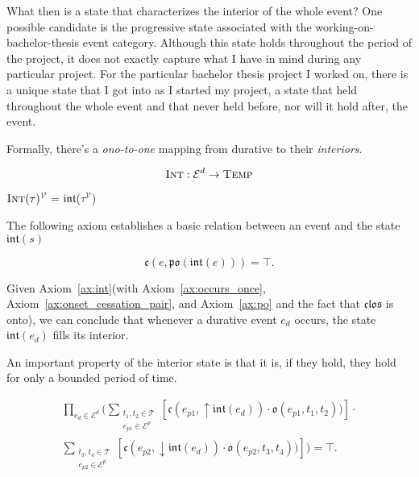 What then is a state that characterizes the interior of the whole event? One possible candidate is the progressive state associated with the working-on-bachelor-thesis event category.
Although this state holds throughout the period of the project, it does not exactly capture what I have in mind during any particular project.
For the particular bachelor thesis project I worked on, there is a unique state that I got into as I started my project, a state that held throughout the whole event and that never held before, nor will it hold after, the event.

Formally, there's a \textit{ono-to-one} mapping from durative to their \textit{interiors}.
\begin{defn}
    \begin{equation}
        \textsc{Int} : \mathcal{E}^{d} \to \textsc{Temp}
    \end{equation}
\end{defn}

\begin{defn}
    \textlbrackdbl $\textsc{Int}(\tau)$\textrbrackdbl$^{\mathcal{V}}$
    = $\mathfrak{int}$(\textlbrackdbl $\tau$\textrbrackdbl$^{\mathcal{V}}$)
\end{defn}

The following axiom establishes a basic relation between an event and the state $\mathfrak{int}(s)$
\begin{axiom}\label{ax:int}
    \begin{equation}
        \mathfrak{c}(e, \mathfrak{po}(\mathfrak{int}(e))) = \top.
    \end{equation}
\end{axiom}

Given Axiom~\ref{ax:int}(with Axiom~\ref{ax:occurs_once}, Axiom~\ref{ax:onset_cessation_pair}, and Axiom~\ref{ax:po} and the fact that $\mathfrak{clos}$ is onto), we can conclude that
whenever a durative event $e_d$ occurs, the state $\mathfrak{int}(e_d)$ fills its interior.

An important property of the interior state is that it is, if they hold, they hold for only a bounded period of time.

\begin{axiom}\label{ax:int_bounded}
    \begin{equation}
        \begin{gathered}
            \prod_{e_d \in \mathcal{E}^{d}} (\sum_{\substack{t_1, t_2 \in \mathcal{T} \\ e_{p1} \in \mathcal{E}^p}}[\mathfrak{c}(e_{p1}, \uparrow \mathfrak{int}(e_d))
            \cdot \mathfrak{o}(e_{p1}, t_1, t_2))] \cdot \\
            \sum_{\substack{t_3, t_4 \in \mathcal{T} \\ e_{p2} \in \mathcal{E}^p}}[\mathfrak{c}(e_{p2}, \downarrow \mathfrak{int}(e_d))
                \cdot \mathfrak{o}(e_{p2}, t_3, t_4))]) = \top.
        \end{gathered}
    \end{equation}
\end{axiom}

